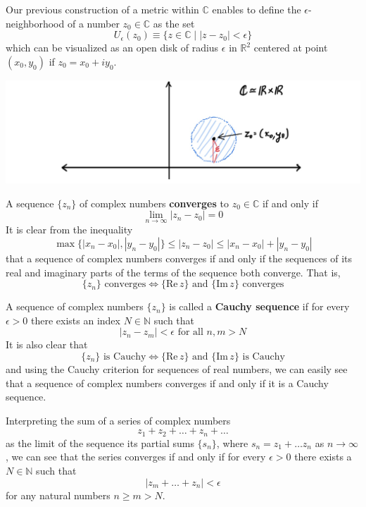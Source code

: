   Our previous construction of a metric within $\mathbb{C}$ enables to define the $\epsilon$-neighborhood of a number $z_0 \in \mathbb{C}$ as the set
  \[U_\epsilon (z_0) \equiv \{z \in \mathbb{C}\;|\; |z - z_0| < \epsilon\}\]
  which can be visualized as an open disk of radius $\epsilon$ in $\mathbb{R}^2$ centered at point $(x_0, y_0)$ if $z_0 = x_0 + i y_0$. 
  \begin{center}
      \includegraphics[scale=0.25]{img/Epsilon_Neighborhood_in_C.jpg}
  \end{center}

  \begin{definition}
    A sequence $\{z_n\}$ of complex numbers \textbf{converges} to $z_0 \in \mathbb{C}$ if and only if 
    \[\lim_{n \rightarrow \infty} |z_n - z_0| = 0\]
    It is clear from the inequality
    \[\max\{|x_n - x_0|, |y_n - y_0|\} \leq |z_n - z_0| \leq |x_n - x_0| + |y_n - y_0|\]
    that a sequence of complex numbers converges if and only if the sequences of its real and imaginary parts of the terms of the sequence both converge. That is, 
    \[\{z_n\} \text{ converges} \iff \{\text{Re}\,z\} \text{ and } \{\text{Im}\,z\} \text{ converges}\]
  \end{definition}

  \begin{lemma}
    A sequence of complex numbers $\{z_n\}$ is called a \textbf{Cauchy sequence} if for every $\epsilon>0$ there exists an index $N \in \mathbb{N}$ such that
    \[|z_n - z_m|<\epsilon \text{ for all } n, m > N\]
    It is also clear that 
    \[\{z_n\} \text{ is Cauchy} \iff \{\text{Re}\,z\} \text{ and } \{\text{Im}\,z\} \text{ is Cauchy}\]
    and using the Cauchy criterion for sequences of real numbers, we can easily see that a sequence of complex numbers converges if and only if it is a Cauchy sequence. 
  \end{lemma}

  \begin{lemma}
    Interpreting the sum of a series of complex numbers
    \[z_1 + z_2 + \ldots + z_n + \ldots\]
    as the limit of the sequence its partial sums $\{s_n\}$, where $s_n = z_1 + \ldots z_n$ as $n \rightarrow \infty$, we can see that the series converges if and only if for every $\epsilon > 0$ there exists a $N \in \mathbb{N}$ such that 
    \[|z_m + \ldots + z_n| < \epsilon\]
    for any natural numbers $n \geq m > N$. 
  \end{lemma}

